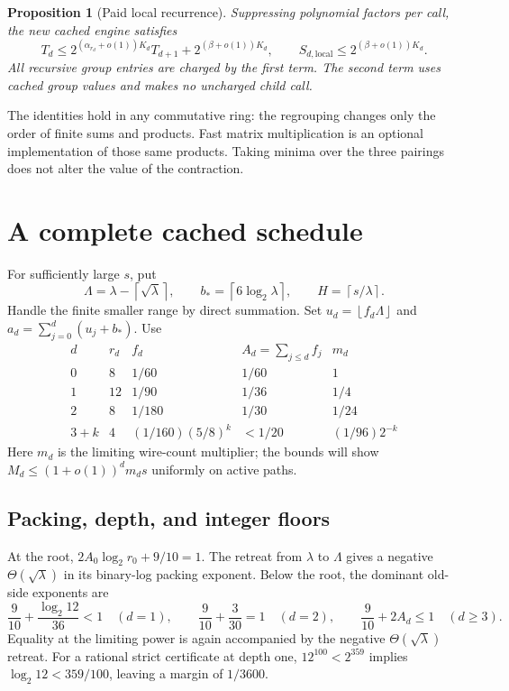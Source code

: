 \documentclass[11pt,letterpaper]{article}
\newtheorem{proposition}[theorem]{Proposition}
\theoremstyle{remark}\newtheorem{remark}[theorem]{Remark}
\newcommand{\ceil}[1]{\left\lceil#1\right\rceil}
\newcommand{\floor}[1]{\left\lfloor#1\right\rfloor}
\begin{document}
\begin{proposition}[Paid local recurrence]\label{prop:recurrence}
Suppressing polynomial factors per call, the new cached engine satisfies
\begin{equation}\label{eq:recurrence}
 T_d\le 2^{(\alpha_{r_d}+o(1))K_d}T_{d+1}
             +2^{(\beta+o(1))K_d},
 \qquad S_{d,\mathrm{local}}\le2^{(\beta+o(1))K_d}.
\end{equation}
All recursive group entries are charged by the first term. The second
term uses cached group values and makes no uncharged child call.
\end{proposition}

The identities hold in any commutative ring: the regrouping changes only
the order of finite sums and products. Fast matrix multiplication is an
optional implementation of those same products. Taking minima over the
three pairings does not alter the value of the contraction.

\section{A complete cached schedule}
\label{sec:cached-schedule}

For sufficiently large $s$, put
\[
 \Lambda=\lambda-\ceil{\sqrt\lambda},\qquad
 b_*=\ceil{6\log_2\lambda},\qquad H=\ceil{s/\lambda}.
\]
Handle the finite smaller range by direct summation. Set
$u_d=\floor{f_d\Lambda}$ and
$a_d=\sum_{j=0}^d(u_j+b_*)$. Use
\begin{equation}\label{eq:cached-schedule}
\begin{array}{c|c|c|c|c}
 d&r_d&f_d&A_d=\sum_{j\le d}f_j&m_d\\\hline
0&8&1/60&1/60&1\\
1&12&1/90&1/36&1/4\\
2&8&1/180&1/30&1/24\\
3+k&4&(1/160)(5/8)^k&<1/20&(1/96)2^{-k}
\end{array}
\end{equation}
Here $m_d$ is the limiting wire-count multiplier; the bounds will show
$M_d\le(1+o(1))^d m_d s$ uniformly on active paths.

\subsection{Packing, depth, and integer floors}

At the root, $2A_0\log_2r_0+9/10=1$. The retreat from $\lambda$ to
$\Lambda$ gives a negative $\Theta(\sqrt\lambda)$ in its binary-log
packing exponent. Below the root, the dominant old-side exponents are
\[
 \frac9{10}+\frac{\log_2 12}{36}<1\quad(d=1),\qquad
 \frac9{10}+\frac3{30}=1\quad(d=2),\qquad
 \frac9{10}+2A_d\le1\quad(d\ge3).
\]
Equality at the limiting power is again accompanied by the negative
$\Theta(\sqrt\lambda)$ retreat. For a rational strict certificate at
depth one, $12^{100}<2^{359}$ implies
$\log_2 12<359/100$, leaving a margin of $1/3600$.
\end{document}
